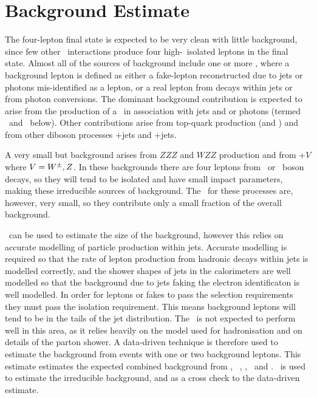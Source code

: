 \graphicspath{{Chapters/BackgroundEstimate/Figures/}}
\chapter{Background Estimate}
\label{chap:BackgroundEstimate}

The four-lepton final state is expected to be very clean with little
background, since few other \sm\ interactions produce four high-\pt\ isolated leptons
in the final state. Almost all of the sources of background include one or more
, where a background
lepton is defined as either a fake-lepton reconstructed due to jets or
photons mis-identified as a lepton, or a real lepton from decays within jets or
from photon conversions.
The dominant background contribution is expected to arise from the production of a \Z\ in
association with jets and or photons (termed \Zjets\ and \Zgamma\ below). Other
contributions arise from top-quark production (\ttbar and \singletop) and from
other diboson processes \WW+jets and \WZ+jets.

A very small but background arises from $ZZZ$ and $WZZ$ production
and from \ttbar+$V$ where $V=W^{\pm},Z$. In these backgrounds there are four leptons
from \W\ or \Z\ boson decays, so they will tend to be isolated and have small
impact parameters, making these irreducible sources of background.
The \cx\ for these processes are, however, very small, so they contribute only a
small fraction of the overall background. 

\mcsim\ can be used to estimate the size of the background, however this relies
on accurate modelling of particle production within jets. Accurate modelling is
required so that the rate of
lepton production from hadronic decays within jets is modelled correctly, and
the shower shapes of jets in the calorimeters are well modelled so that the
background due to jets faking the electron identificaton is well modelled. In
order for leptons or fakes to pass the selection requirements they must pass the
isolation requirement. This means background leptons will tend to be in the
tails
of the jet distribution. The \mc\ is not expected to
perform well in this area, as it relies heavily on the model used for
hadronisation and on details of the parton shower. A data-driven technique is
therefore used to estimate the background from events with one or two background
leptons. This estimate estimates the expected combined background from \Zjets,
\Zgamma\, \WW, \WZ, \ttbar\ and \singletop. \mc\ is used to estimate the
irreducible background, and as a cross check to the data-driven estimate.

